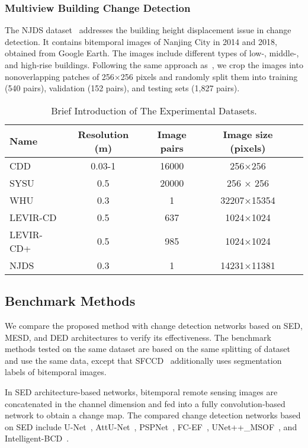 \documentclass[journal]{IEEEtran}
\begin{document}
\subsubsection{Multiview Building Change Detection}

The NJDS dataset~\cite{njds} addresses the building height displacement issue in change detection. It contains bitemporal images of Nanjing City in 2014 and 2018, obtained from Google Earth. The images include different types of low-, middle-, and high-rise buildings. Following the same approach as~\cite{njds}, we crop the images into nonoverlapping patches of 256×256 pixels and randomly split them into training (540 pairs), validation (152 pairs), and testing sets (1,827 pairs).

\begin{table}[!ht]
\caption{Brief Introduction of The Experimental Datasets.}
\label{datasets_introduction}
\centering
\begin{tabular}{lcccc}
\toprule
Name & Resolution (m) & Image pairs & Image size (pixels) \\
\midrule
CDD & 0.03-1 & 16000 & 256×256 \\
SYSU & 0.5 & 20000 & 256 × 256 \\
WHU & 0.3 & 1 & 32207×15354 \\
LEVIR-CD & 0.5 & 637 & 1024×1024 \\
LEVIR-CD+ & 0.5 & 985 & 1024×1024 \\
NJDS & 0.3 & 1 & 14231×11381 \\
\bottomrule
\end{tabular}
\end{table}


\subsection{Benchmark Methods}
We compare the proposed method with change detection networks based on SED, MESD, and DED architectures to verify its effectiveness. The benchmark methods tested on the same dataset are based on the same splitting of dataset and use the same data, except that SFCCD~\cite{njds} additionally uses segmentation labels of bitemporal images.

In SED architecture-based networks, bitemporal remote sensing images are concatenated in the channel dimension and fed into a fully convolution-based network to obtain a change map. The compared change detection networks based on SED include U-Net~\cite{unet}, AttU-Net~\cite{aunet}, PSPNet~\cite{psp}, FC-EF~\cite{fcef}, UNet++\_MSOF~\cite{etecd}, and Intelligent-BCD~\cite{ibcd}.
\end{document}
